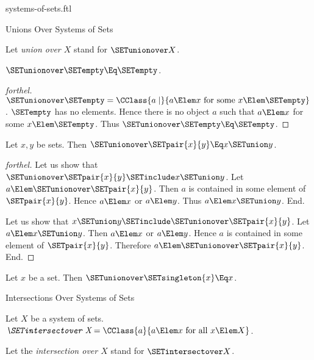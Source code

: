 \documentclass{stex}
\begin{document}
\begin{smodule}{systems-of-sets.ftl}
\begin{sfragment}{Unions Over Systems of Sets}
\begin{definition}[forthel,id=FOUNDATIONS_10_541772562300928]
    Let \emph{union over $X$} stand for $\SETunionover X$.
  \end{definition}

  \begin{proposition}[forthel,id=FOUNDATIONS_10_4872701241982976]
    $\SETunionover \SETempty \Eq \SETempty$.
  \end{proposition}
  \begin{proof}[forthel]
    $\SETunionover \SETempty = \CClass{a \mid}{a \Elem x\text{ for some }x \Elem \SETempty}$.
    $\SETempty$ has no elements.
    Hence there is no object $a$ such that $a \Elem x$ for some $x \Elem \SETempty$.
    Thus $\SETunionover \SETempty \Eq \SETempty$.
  \end{proof}

  \begin{proposition}[forthel,id=FOUNDATIONS_10_2559541585641472]
    Let $x, y$ be sets.
    Then $\SETunionover \SETpair{x}{y} \Eq x \SETunion y$.
  \end{proposition}
  \begin{proof}[forthel]
    Let us show that $\SETunionover \SETpair{x}{y} \SETinclude x \SETunion y$.
      Let $a \Elem \SETunionover \SETpair{x}{y}$.
      Then $a$ is contained in some element of $\SETpair{x}{y}$.
      Hence $a \Elem x$ or $a \Elem y$.
      Thus $a \Elem x \SETunion y$.
    End.

    Let us show that $x \SETunion y \SETinclude \SETunionover \SETpair{x}{y}$.
      Let $a \Elem x \SETunion y$.
      Then $a \Elem x$ or $a \Elem y$.
      Hence $a$ is contained in some element of $\SETpair{x}{y}$.
      Therefore $a \Elem \SETunionover \SETpair{x}{y}$.
    End.
  \end{proof}

  \begin{corollary}[forthel,id=FOUNDATIONS_10_2157223832715264]
    Let $x$ be a set.
    Then $\SETunionover \SETsingleton{x} \Eq x$.
  \end{corollary}
\end{sfragment}

\begin{sfragment}{Intersections Over Systems of Sets}
  \begin{definition}[forthel,id=FOUNDATIONS_10_2659345095458816]
    Let $X$ be a system of sets.
    $\emph{\SETintersectover X} = \CClass{a}{a \Elem x\text{ for all }x \Elem X}$.

    Let the \emph{intersection over $X$} stand for $\SETintersectover X$.
  \end{definition}


\end{sfragment}
\end{smodule}
\end{document}
